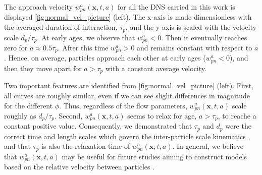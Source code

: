 The approach velocity $w_{pn}^a(\textbf{x},t,a)$ for all the DNS carried in this work is displayed \ref{fig:normal_vel_picture} (left). 
The x-axis is made dimensionless with the averaged duration of interaction, $\tau_p$, and the y-axis is scaled with the velocity scale $d_p /\tau_p$. 
At early ages, we observe that $w_{pn}^a<0$.
Then it eventually reaches zero for  $a \approx 0.5\tau_p$.
After this time $w_{pn}^a>0$ and remains constant with respect to $a$. 
Hence, on average, particles approach each other at early ages ($w_{pn}^a<0$), and then they move apart for $a > \tau_p$ with a constant average velocity.

Two important features are identified from \ref{fig:normal_vel_picture} (left).
First, all curves are roughly similar, even if we can see slight differences in magnitude for the different $\phi$. 
Thus, regardless of the flow parameters, $w_{pn}^a(\textbf{x},t,a)$ scale roughly as $d_p /\tau_p$. 
Second,  $w_{pn}^a(\textbf{x},t,a)$ seems to relax for age, $a > \tau_p$, to reache a constant positive value. 
Consequently, we demonstrated that $\tau_p$ and $d_p$ were the correct time and length scales which govern the inter-particle scale kinematics  , and that $\tau_p$ is also the relaxation time of $w_{pn}^a(\textbf{x},t,a)$. 
In general, we believe that $w_{pn}^a(\textbf{x},t,a)$ may be useful for future studies aiming to construct models based on the relative velocity between particles \citep{rao2008introduction}. 


